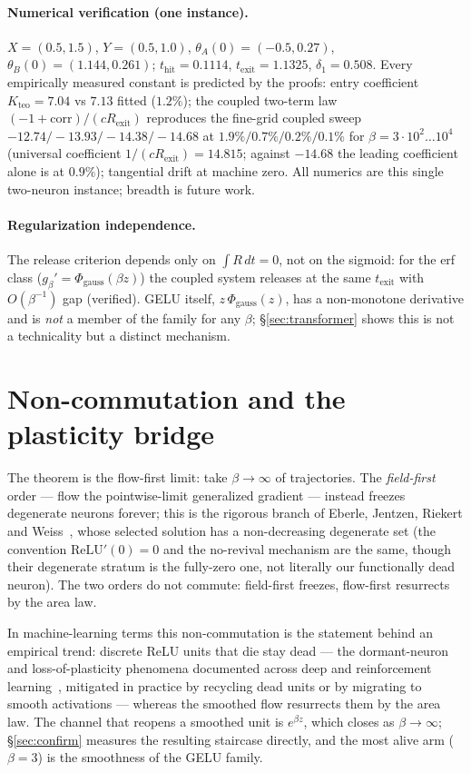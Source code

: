 \documentclass[11pt]{article}
\newcommand{\thit}{t_{\mathrm{hit}}}
\newcommand{\texit}{t_{\mathrm{exit}}}
\begin{document}
\paragraph{Numerical verification (one instance).}
$X=(0.5,1.5)$, $Y=(0.5,1.0)$, $\theta_A(0)=(-0.5,0.27)$,
$\theta_B(0)=(1.144,0.261)$; $\thit=0.1114$, $\texit=1.1325$, $\delta_1=0.508$.
Every empirically measured constant is predicted by the proofs: entry
coefficient $K_{\mathrm{teo}}=7.04$ vs $7.13$ fitted ($1.2\%$); the coupled
two-term law $(-1+\mathrm{corr})/(cR_{\mathrm{exit}})$ reproduces the fine-grid
coupled sweep $-12.74/-13.93/-14.38/-14.68$ at $1.9\%/0.7\%/0.2\%/0.1\%$ for
$\beta=3\cdot10^2\ldots10^4$ (universal coefficient
$1/(cR_{\mathrm{exit}})=14.815$; against $-14.68$ the leading coefficient alone
is at $0.9\%$); tangential drift at machine zero. All numerics are this single
two-neuron instance; breadth is future work.

\paragraph{Regularization independence.}
The release criterion depends only on $\int R\,dt=0$, not on the sigmoid: for the
erf class ($g_\beta'=\Phi_{\mathrm{gauss}}(\beta z)$) the coupled system releases
at the same $\texit$ with $O(\beta^{-1})$ gap (verified). GELU itself,
$z\,\Phi_{\mathrm{gauss}}(z)$, has a non-monotone derivative and is \emph{not} a
member of the family for any $\beta$; \S\ref{sec:transformer} shows this is not a
technicality but a distinct mechanism.

\section{Non-commutation and the plasticity bridge}\label{sec:noncomm}

The theorem is the flow-first limit: take $\beta\to\infty$ of trajectories. The
\emph{field-first} order --- flow the pointwise-limit generalized gradient ---
instead freezes degenerate neurons forever; this is the rigorous branch of
Eberle, Jentzen, Riekert and Weiss~\cite{EJRW23}, whose selected solution has a
non-decreasing degenerate set (the convention $\mathrm{ReLU}'(0)=0$ and the
no-revival mechanism are the same, though their degenerate stratum is the
fully-zero one, not literally our functionally dead neuron). The two orders do
not commute: field-first freezes, flow-first resurrects by the area law.

In machine-learning terms this non-commutation is the statement behind an
empirical trend: discrete ReLU units that die stay dead --- the dormant-neuron
and loss-of-plasticity phenomena documented across deep and reinforcement
learning~\cite{Sokar23,Lyle23,Dohare24}, mitigated in practice by recycling dead
units or by migrating to smooth activations --- whereas the smoothed flow
resurrects them by the area law. The channel that reopens a smoothed unit is
$e^{\beta z}$, which closes as $\beta\to\infty$; \S\ref{sec:confirm} measures the
resulting staircase directly, and the most alive arm ($\beta=3$) is the
smoothness of the GELU family.
\end{document}
